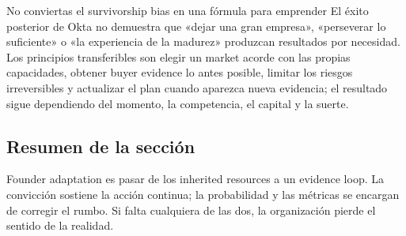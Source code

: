
\begin{warningbox}{No conviertas el survivorship bias en una fórmula para emprender}
El éxito posterior de Okta no demuestra que «dejar una gran empresa», «perseverar lo suficiente» o «la experiencia de la madurez» produzcan resultados por necesidad. Los principios transferibles son elegir un market acorde con las propias capacidades, obtener buyer evidence lo antes posible, limitar los riesgos irreversibles y actualizar el plan cuando aparezca nueva evidencia; el resultado sigue dependiendo del momento, la competencia, el capital y la suerte.
\end{warningbox}

\subsection{Resumen de la sección}

Founder adaptation es pasar de los inherited resources a un evidence loop. La convicción sostiene la acción continua; la probabilidad y las métricas se encargan de corregir el rumbo. Si falta cualquiera de las dos, la organización pierde el sentido de la realidad.
